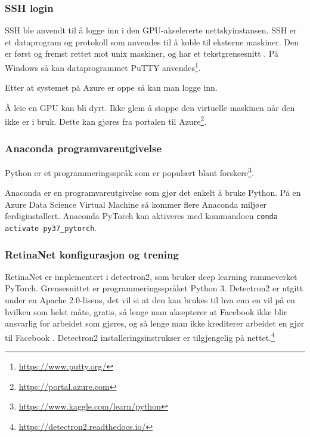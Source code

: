 
\subsubsection{SSH login}

SSH ble anvendt til å logge inn i den GPU-akselererte nettskyinstansen. SSH er et dataprogram og protokoll som anvendes til å koble til eksterne maskiner. Den er først og fremst rettet mot unix maskiner, og har et tekstgrensesnitt \cite{Mallick m.fl. 2020}. På Windows så kan dataprogrammet PuTTY anvendes\footnote{\url{https://www.putty.org/}}.

Etter at systemet på Azure er oppe så kan man logge inn.%

Å leie en GPU kan bli dyrt. Ikke glem å stoppe den virtuelle maskinen når den ikke er i bruk. Dette kan gjøres fra portalen til Azure\footnote{\url{https://portal.azure.com}}.


\subsubsection{Anaconda programvareutgivelse}

Python er et programmeringsspråk som er populært blant forskere\footnote{\url{https://www.kaggle.com/learn/python}}. \cite{Morris 2020}

Anaconda er en programvareutgivelse som gjør det enkelt å bruke Python. På en Azure Data Science Virtual Machine så kommer flere Anaconda miljøer ferdiginstallert. Anaconda PyTorch kan aktiveres med kommandoen \texttt{conda activate py37\_pytorch}. \cite{Mallick m.fl. 2020} %

\subsubsection{RetinaNet konfigurasjon og trening}

RetinaNet er implementert i detectron2, som bruker deep learning rammeverket PyTorch. Grensesnittet er programmeringsspråket Python 3. Detectron2 er utgitt under en Apache 2.0-lisens, det vil si at den kan brukes til hva enn en vil på en hvilken som helst måte, gratis, så lenge man aksepterer at Facebook ikke blir ansvarlig for arbeidet som gjøres, og så lenge man ikke krediterer arbeidet en gjør til Facebook \cite{The Apache Software Foundation 2004}. Detectron2 installeringsinstrukser er tilgjengelig på nettet.\footnote{\url{https://detectron2.readthedocs.io/}}

